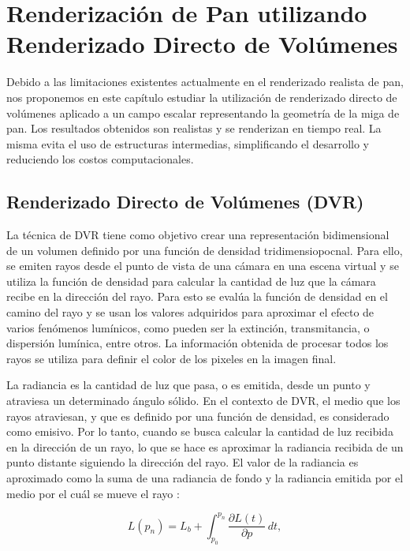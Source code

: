 \documentclass[spanish,a4paper,11pt,oneside,links]{report}
\begin{document}

\chapter{Renderización de Pan utilizando Renderizado Directo de Volúmenes}
Debido a las limitaciones existentes actualmente en el renderizado realista de pan, nos proponemos en este capítulo estudiar la utilización de renderizado directo de volúmenes aplicado a un campo escalar representando la geometría de la miga de pan. Los resultados obtenidos son realistas y se renderizan en tiempo real. La misma evita el uso de estructuras intermedias, simplificando el desarrollo y reduciendo los costos computacionales.

\section{Renderizado Directo de Volúmenes (DVR)}
La técnica de DVR tiene como objetivo crear una representación bidimensional de un volumen
definido por una función de densidad tridimensiopocnal. Para ello, se emiten rayos desde el punto de vista de una cámara en una escena virtual y se utiliza la función de densidad para calcular la cantidad de luz que la cámara recibe en la dirección del rayo. Para esto se evalúa la función de densidad en el camino del rayo y se usan los valores adquiridos para aproximar el efecto de varios fenómenos lumínicos, como pueden ser la extinción, transmitancia, o dispersión lumínica, entre otros. La información obtenida de procesar todos los rayos se utiliza para definir el color de los pixeles en la imagen final.

La radiancia es la cantidad de luz que pasa, o es emitida, desde un punto y atraviesa un determinado ángulo sólido. En el contexto de DVR, el medio que los rayos atraviesan, y que es definido por una función de densidad, es considerado como emisivo. Por lo tanto, cuando se busca calcular la cantidad de luz recibida en la dirección de un rayo, lo que se hace es aproximar la radiancia recibida de un punto distante siguiendo la dirección del rayo. El valor de la radiancia es aproximado como la suma de una radiancia de fondo y la radiancia emitida por el medio por el cuál se mueve el rayo \cite{Kratz2006} :

\begin{equation} \label{eq:general_radiance}  
  L(p_n) = L_b + \int_{p_0}^{p_n} \frac{\partial L(t)}{\partial p} \, dt,
\end{equation}
\end{document}
